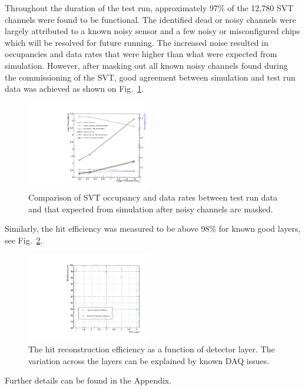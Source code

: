 Throughout the duration of the test run, approximately 97\% of the 12,780 SVT 
channels were found to be functional.
The identified dead or noisy channels were largely attributed to a 
known noisy sensor and a few noisy or misconfigured chips which will be resolved for future running. The 
increased noise resulted in occupancies and data rates that were higher than what were expected from simulation.
However, after masking out all known noisy channels found during the commissioning of the SVT, good agreement 
between simulation and test run data was achieved as shown on Fig.~\ref{fig:data_rates_data_mc_cmp}.
\begin{figure}[h]
    \includegraphics[width=0.49\textwidth]{test2012/svtperformance/daq/data_rates.pdf}
        \caption{ { \small
                    Comparison of SVT occupancy and data rates between test run data and that expected from simulation after noisy channels are masked.
                } }
	\label{fig:data_rates_data_mc_cmp}
\end{figure}
Similarly, the hit efficiency was measured to be above 98\% for known good layers, see Fig.~\ref{fig:hit_efficiency}.
\begin{figure}[h]
    	\includegraphics[width=0.49\textwidth]{test2012/svtperformance/trk_performance/hit_efficiency_vs_layer.pdf}
        \caption{{\small The hit reconstruction efficiency as a function of detector layer. The variation across the layers can be explained by known DAQ issues.}} 
	\label{fig:hit_efficiency}
\end{figure}
Further details can be found in the Appendix. 
